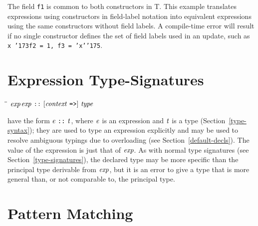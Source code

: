The field \mbox{\tt f1} is common to both constructors in T.  This
example translates expressions using constructors in field-label
notation into equivalent expressions using the same constructors
without field labels. 
A compile-time error will result if no single constructor
defines the set of field labels used in an update, such as
\mbox{\tt x\ {\char'173}f2\ =\ 1,\ f3\ =\ 'x'{\char'175}}. 

\section{Expression Type-Signatures}
\label{expression-type-sigs}
%
\begin{flushleft}\it\begin{tabbing}
\hspace{0.6in}\=\hspace{3.1in}\=\kill
$\it exp$\>\makebox[3.5em]{$\rightarrow$}$\it exp\ \makebox{\tt ::}\ [context\ \makebox{\tt =>}]\ type$
\end{tabbing}\end{flushleft}
\indextt{::}

 have the form \mbox{$\it e\ \makebox{\tt ::}\ t$}, where \mbox{$\it e$}
is an expression and \mbox{$\it t$} is a type (Section~\ref{type-syntax}); they
are used to type an expression explicitly
and may be used to resolve ambiguous typings due to overloading (see
Section~\ref{default-decls}).  The value of the expression is just that of
\mbox{$\it exp$}.  As with normal type signatures (see
Section~\ref{type-signatures}), the declared type may be more specific than 
the principal type derivable from \mbox{$\it exp$}, but it is an error to give
a type that is more general than, or not comparable to, the
principal type.


\section{Pattern Matching}
\label{pattern-matching}
\label{patterns}

